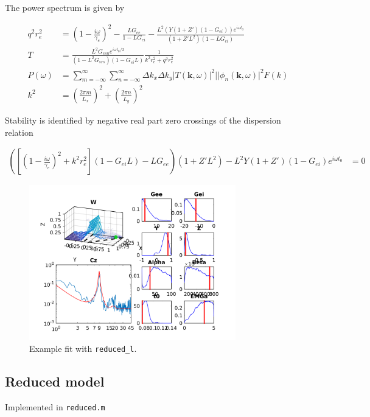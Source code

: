 \documentclass[10pt,a4paper]{article}
\begin{document}
The power spectrum is given by

\begin{align}
 q^2r_e^2 &=  \left( 1-\frac{i\omega}{\gamma_e} \right)^2 - \frac{LG_{ee}}{1-LG_{ei}} - \frac{L^2(Y\left( 1+Z'\right)(1-G_{ei}))e^{i\omega t_0}}{\left( 1+Z' L^2 \right)(1-LG_{ei})}\\
 T &=  \frac{L^2G_{esn}e^{i\omega t_0 /2}}{(1 - L^2 G_{srs})(1-G_{ei}L)} \frac{1}{k^2r_e^2 + q^2r_e^2}\\
 P(\omega) &= \sum_{m = -\infty}^{\infty}\sum_{n = -\infty}^{\infty} \Delta k_x \Delta k_y |T(\mathbf{k},\omega)|^2||\phi_n(\mathbf{k},\omega)|^2F(k)\\
k^2 &=  \left( \frac{2\pi m}{L_x} \right)^2 + \left( \frac{2\pi n}{L_y}\right)^2 
\end{align}

Stability is identified by negative real part zero crossings of the dispersion relation

\begin{align}
\label{eqn:dispersion_relation}
\left( \left[ \left( 1-\frac{i\omega}{\gamma_e} \right)^2 + k^2r_e^2 \right](1-G_{ei}L) - LG_{ee} \right) \left( 1+Z' L^2 \right) - L^2 Y\left( 1+Z' \right)\left( 1-G_{ei} \right) e^{i\omega t_0} &= 0
\end{align}

\begin{figure}[h!]
\begin{center}
\includegraphics[width=0.8\textwidth]{example_reduced_l}
\caption{Example fit with \texttt{reduced\_l}.}
\label{fig:full}
\end{center}
\end{figure}

\clearpage

\subsection{Reduced model}
Implemented in {\tt reduced.m}
\end{document}
